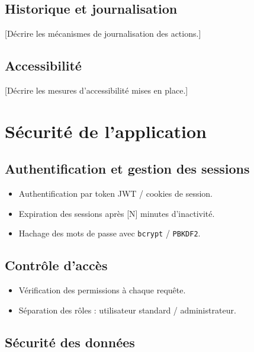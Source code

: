 \documentclass[12pt, a4paper]{article}
\begin{document}
\subsection{Historique et journalisation}

[Décrire les mécanismes de journalisation des actions.]

\subsection{Accessibilité}

[Décrire les mesures d'accessibilité mises en place.]

\section{Sécurité de l'application}

\subsection{Authentification et gestion des sessions}

\begin{itemize}
  \item Authentification par token JWT / cookies de session.
  \item Expiration des sessions après [N] minutes d'inactivité.
  \item Hachage des mots de passe avec \texttt{bcrypt} / \texttt{PBKDF2}.
\end{itemize}

\subsection{Contrôle d'accès}

\begin{itemize}
  \item Vérification des permissions à chaque requête.
  \item Séparation des rôles : utilisateur standard / administrateur.
\end{itemize}

\subsection{Sécurité des données}
\end{document}
